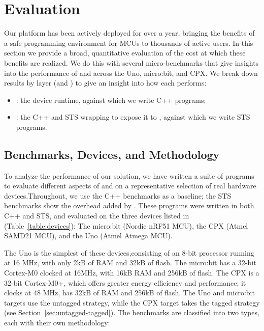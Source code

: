 \section{Evaluation}
\label{sec:evaluate}

Our platform has been actively deployed for over a year, bringing the benefits of a safe programming environment for MCUs to thousands of active users. In this section we provide a broad, quantitative evaluation of the cost at which these benefits are realized. We do this with several micro-benchmarks that give insights into the performance of \MC and \CO across the Uno, micro:bit, and CPX. We break down results by layer (\CO and \MCN) to give an insight into how each performs:
\begin{itemize}
\item \emph{\CON}: the device runtime, against which we write C++ programs;
\item \emph{\MCN}: the C++ and STS wrapping \CO to expose it to \MCN, against which we write STS programs.
\end{itemize}

\subsection{Benchmarks, Devices, and Methodology}

To analyze the performance of our solution, we have written a suite of programs to evaluate different aspects of \MC and \CO  on a representative selection of real hardware devices.Throughout, we use the C++ \CO benchmarks as a baseline; the STS benchmarks show the overhead added by \MC. These programs were written in both C++ and STS, and evaluated on the three devices listed in (Table~\ref{table:devices}): The micro:bit (Nordic nRF51 MCU), the CPX (Atmel SAMD21 MCU), and the Uno (Atmel Atmega MCU).

The Uno is the simplest of these devices,consisting of an 8-bit processor running at 16 MHz, with only 2kB of RAM and 32kB of flash.
The micro:bit has a 32-bit Cortex-M0 clocked at 16MHz, with 16kB RAM and 256kB of flash. The CPX is a 32-bit Cortex-M0+, which offers greater energy efficiency and performance; it clocks at 48 MHz, has 32kB of RAM and 256kB of flash. The Uno and micro:bit \MC targets use the untagged strategy, while the CPX target takes the tagged strategy (see Section~\ref{sec:untagged-tagged}). The benchmarks are classified into two types, each with their own methodology:

